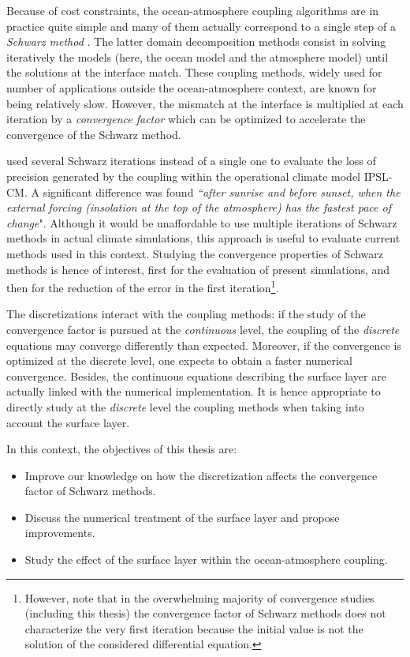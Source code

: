 \par %
Because of cost constraints, the ocean-atmosphere coupling algorithms
are in practice quite simple and many of them actually
correspond to a single step of a \textit{Schwarz method}
\citep{lemarie_analysis_2015}. The latter domain decomposition methods consist in solving
iteratively the models (here, the ocean model and the
atmosphere model) until the solutions at the interface match.
These coupling methods, widely used for number of applications
outside the ocean-atmosphere context, are known for being relatively
slow. However, the mismatch at the interface is multiplied
at each iteration by a \textit{convergence factor} which
can be optimized to accelerate the convergence of the
Schwarz method.
\par %
\citep{marti_schwarz_2021} used several Schwarz iterations
instead of a single one to evaluate the loss of precision
generated by the coupling within the operational climate model
IPSL-CM. A significant difference was found
\textit{``after sunrise
and before sunset, when the external forcing (insolation at
the top of the atmosphere) has the fastest pace of change}".
Although it would be unaffordable to use multiple
iterations of Schwarz methods in actual climate simulations,
this approach is useful to evaluate current methods
used in this context.
Studying the convergence properties of Schwarz methods is
hence of interest, first for the evaluation of present simulations,
and then for the reduction of the
error in the first iteration\footnote{However, note that
in the overwhelming majority of convergence studies
(including this thesis) the convergence factor of
Schwarz methods does not characterize the very first iteration
because the initial value is not the solution of the
considered differential equation.}.
\par %
The discretizations interact with the coupling methods:
if the study of the convergence factor is pursued at the
\textit{continuous} level, the coupling of the \textit{discrete}
equations may converge differently than expected. Moreover,
if the convergence is optimized at the discrete level, one expects
to obtain a faster numerical convergence.
Besides, the continuous equations describing the surface
layer are actually linked with the numerical implementation.
It is hence appropriate to directly study at the \textit{discrete}
level the coupling methods when taking into account
the surface layer.
\par %
In this context, the objectives of this thesis are:
\begin{itemize}
\item Improve our knowledge on how the discretization affects
the convergence factor of Schwarz methods.
\item Discuss the numerical treatment of the surface layer and propose
	improvements.
\item Study the effect of the surface layer within
	the ocean-atmosphere coupling.
\end{itemize}

